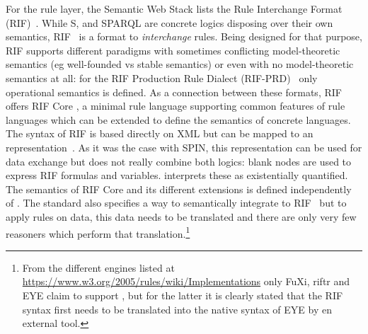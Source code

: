 For the rule layer, the Semantic Web Stack lists the Rule Interchange Format (RIF)~\cite{rif}.
While \rdf{}S, \owl and SPARQL are concrete logics disposing 
over their own semantics, RIF~\cite{rif} is a format to \emph{interchange} rules. 
Being designed for that purpose, RIF supports different paradigms with sometimes 
conflicting model-theoretic semantics (eg well-founded vs stable semantics) or even with no model-theoretic semantics at all: 
for the RIF Production Rule Dialect (RIF-PRD)~\cite{rifprd} only operational semantics is defined. 
As a connection between these formats, RIF offers RIF Core \cite{rifcore}, a minimal rule language supporting common features of rule languages which can be 
extended to define the semantics of concrete languages.
The syntax of RIF is based directly on XML but can be mapped to an \rdf representation~\cite{rifinrdf}. 
As it was the case with SPIN, this representation can be used for data exchange but does not really combine both logics: 
blank nodes are used to express RIF formulas and variables. \rdf interprets these as existentially quantified.
The semantics of 
RIF Core and its different extensions is defined independently of \rdf. 
The standard also specifies a way to semantically integrate \rdf to RIF~\cite{rifrdf} but to apply rules on \rdf data, this data needs to be translated
and there are only very few reasoners which perform that translation.\footnote{From the different engines listed at \url{https://www.w3.org/2005/rules/wiki/Implementations}
only FuXi, riftr and EYE 
claim to support \rdf, but for the latter it is clearly stated that the RIF syntax first needs to be translated into the native syntax of EYE by en external tool. }


